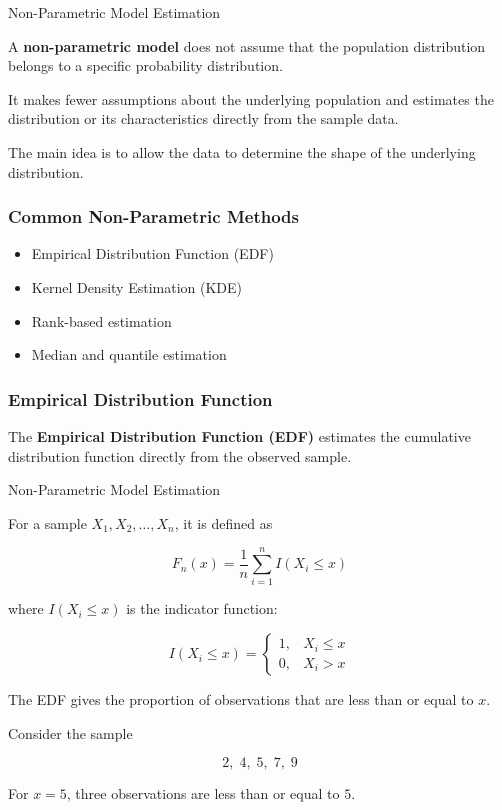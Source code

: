 \documentclass[aspectratio=169]{beamer}
\begin{document}
\begin{frame}{Non-Parametric Model Estimation}

A \textbf{non-parametric model} does not assume that the population
distribution belongs to a specific probability distribution.

It makes fewer assumptions about the underlying population and estimates
the distribution or its characteristics directly from the sample data.

\vspace{0.2cm}

The main idea is to allow the data to determine the shape of the
underlying distribution.

\subsubsection*{Common Non-Parametric Methods}

\begin{itemize}
    \item Empirical Distribution Function (EDF)
    \item Kernel Density Estimation (KDE)
    \item Rank-based estimation
    \item Median and quantile estimation
\end{itemize}


\subsubsection*{Empirical Distribution Function}

The \textbf{Empirical Distribution Function (EDF)} estimates the
cumulative distribution function directly from the observed sample.
\end{frame}


\begin{frame}{Non-Parametric Model Estimation}

For a sample $X_1,X_2,\ldots,X_n$, it is defined as

\[
\boxed{
F_n(x)=
\frac{1}{n}
\sum_{i=1}^{n} I(X_i\leq x)
}
\]

where $I(X_i\leq x)$ is the indicator function:

\[
I(X_i\leq x)=
\begin{cases}
1, & X_i\leq x\\
0, & X_i>x
\end{cases}
\]

The EDF gives the proportion of observations that are less than or
equal to $x$.


Consider the sample

\[
2,\;4,\;5,\;7,\;9
\]

For $x=5$, three observations are less than or equal to $5$.
\end{frame}
\end{document}
